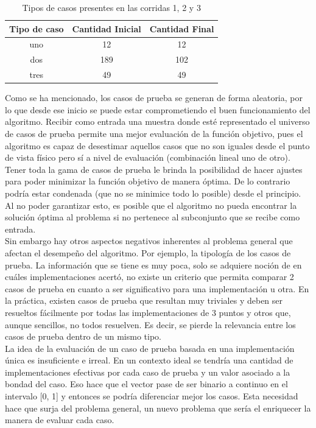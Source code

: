 \documentclass[a4paper,12pt]{book}
\begin{document}
 	
 	\begin{table}[h]
 		\begin{center}
 			\begin{tabular}{| c | c | c |} \hline
 				Tipo de caso & Cantidad Inicial & Cantidad Final \\ \hline
 				uno & 12 & 12 \\
 				dos & 189 & 102 \\
 				tres & 49 & 49 \\ \hline
 			\end{tabular}
 			\caption{Tipos de casos presentes en las corridas 1, 2 y 3}
 			\label{tab:Tiposdecasos123}
 		\end{center}
 	\end{table}
 
 	
	Como se ha mencionado, los casos de prueba se generan de forma aleatoria, por lo que desde ese inicio se puede estar comprometiendo el buen funcionamiento del algoritmo. Recibir como entrada una muestra donde esté representado el universo de casos de prueba permite una mejor evaluación de la función objetivo, pues el algoritmo es capaz de desestimar aquellos casos que no son iguales desde el punto de vista físico pero sí a nivel de evaluación (combinación lineal uno de otro). Tener toda la gama de casos de prueba le brinda la posibilidad de hacer ajustes para poder minimizar la función objetivo de manera óptima. De lo contrario podría estar condenada (que no se minimice todo lo posible) desde el principio. Al no poder garantizar esto, es posible que el algoritmo no pueda encontrar la solución óptima al problema si no pertenece al subconjunto que se recibe como entrada. \\
	
	Sin embargo hay otros aspectos negativos inherentes al problema general que afectan el desempeño del algoritmo. Por ejemplo, la tipología de los casos de prueba. La información que se tiene es muy poca, solo se adquiere noción de en cuáles implementaciones acertó, no existe un criterio que permita comparar 2 casos de prueba en cuanto a ser significativo para una implementación u otra. En la práctica, existen casos de prueba que resultan muy triviales y deben ser resueltos fácilmente por todas las implementaciones de 3 puntos y otros que, aunque sencillos, no todos resuelven. Es decir, se pierde la relevancia entre los casos de prueba dentro de un mismo tipo. \\
	
	La idea de la evaluación de un caso de prueba basada en una implementación única es insuficiente e irreal. En un contexto ideal se tendría una cantidad de implementaciones efectivas por cada caso de prueba y un valor asociado a la bondad del caso. Eso hace que el vector pase de ser binario a continuo en el intervalo [0, 1] y entonces se podría diferenciar mejor los casos. Esta necesidad hace que surja del problema general, un nuevo problema que sería el enriquecer la manera de evaluar cada caso.
	
\end{document}
